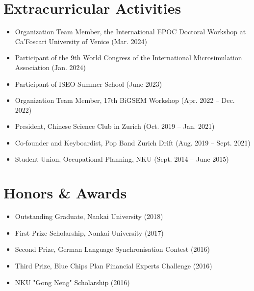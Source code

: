 \documentclass[11pt,a4paper]{article}
\begin{document}
\section*{Extracurricular Activities}
\begin{itemize}[noitemsep]
  \item Organization Team Member, the International EPOC Doctoral Workshop at Ca’Foscari University of Venice (Mar. 2024)
  \item Participant of the 9th World Congress of the International Microsimulation Association (Jan. 2024)
  \item Participant of ISEO Summer School (June 2023)
  \item Organization Team Member, 17th BiGSEM Workshop (Apr. 2022 -- Dec. 2022)
  \item President, Chinese Science Club in Zurich (Oct. 2019 -- Jan. 2021)
  \item Co-founder and Keyboardist, Pop Band Zurich Drift (Aug. 2019 -- Sept. 2021)
  \item Student Union, Occupational Planning, NKU (Sept. 2014 -- June 2015)
\end{itemize}

\section*{Honors \& Awards}
\begin{itemize}[noitemsep]
  \item Outstanding Graduate, Nankai University (2018)
  \item First Prize Scholarship, Nankai University (2017)
  \item Second Prize, German Language Synchronisation Contest (2016)
  \item Third Prize, Blue Chips Plan Financial Experts Challenge (2016)
  \item NKU "Gong Neng" Scholarship (2016)
\end{itemize}
\end{document}
